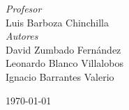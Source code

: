 		{\large\textit{Profesor}}\\
	Luis Barboza Chinchilla\\[0.5cm]
	
	{\large\textit{Autores}}\\
	David Zumbado Fernández \\ %
	Leonardo Blanco Villalobos\\
	Ignacio Barrantes Valerio
	
	
	\vfill\vfill\vfill %
	
	{\large\today} %
	
	
	 
	
	\vfill %
	
	
